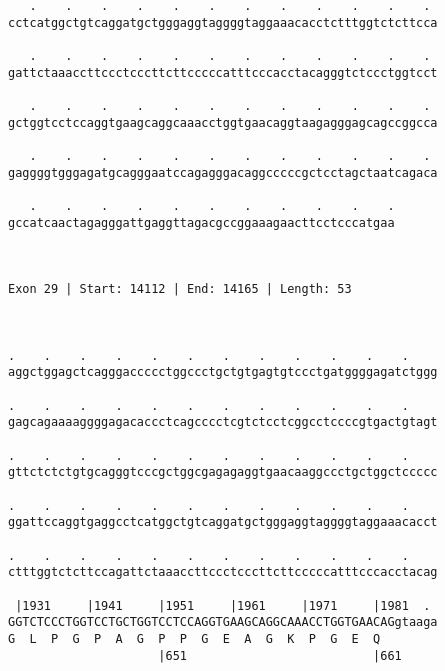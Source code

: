 \documentclass{article}
\begin{document}
\begin{Verbatim}
   .    .    .    .    .    .    .    .    .    .    .    . 
cctcatggctgtcaggatgctgggaggtaggggtaggaaacacctctttggtctcttcca
                                                            
   .    .    .    .    .    .    .    .    .    .    .    . 
gattctaaaccttccctcccttcttcccccatttcccacctacagggtctccctggtcct
                                                            
   .    .    .    .    .    .    .    .    .    .    .    . 
gctggtcctccaggtgaagcaggcaaacctggtgaacaggtaagagggagcagccggcca
                                                            
   .    .    .    .    .    .    .    .    .    .    .    . 
gaggggtgggagatgcagggaatccagagggacaggcccccgctcctagctaatcagaca
                                                            
   .    .    .    .    .    .    .    .    .    .    .
gccatcaactagagggattgaggttagacgccggaaagaacttcctcccatgaa
                                                      
                                                      
 
Exon 29 | Start: 14112 | End: 14165 | Length: 53



.    .    .    .    .    .    .    .    .    .    .    .    
aggctggagctcagggaccccctggccctgctgtgagtgtccctgatggggagatctggg
                                                            
.    .    .    .    .    .    .    .    .    .    .    .    
gagcagaaaaggggagacaccctcagcccctcgtctcctcggcctccccgtgactgtagt
                                                            
.    .    .    .    .    .    .    .    .    .    .    .    
gttctctctgtgcagggtcccgctggcgagagaggtgaacaaggccctgctggctccccc
                                                            
.    .    .    .    .    .    .    .    .    .    .    .    
ggattccaggtgaggcctcatggctgtcaggatgctgggaggtaggggtaggaaacacct
                                                            
.    .    .    .    .    .    .    .    .    .    .    .    
ctttggtctcttccagattctaaaccttccctcccttcttcccccatttcccacctacag
                                                            
 |1931     |1941     |1951     |1961     |1971     |1981  . 
GGTCTCCCTGGTCCTGCTGGTCCTCCAGGTGAAGCAGGCAAACCTGGTGAACAGgtaaga
G  L  P  G  P  A  G  P  P  G  E  A  G  K  P  G  E  Q        
                     |651                          |661     
  

\end{Verbatim}
\end{document}
